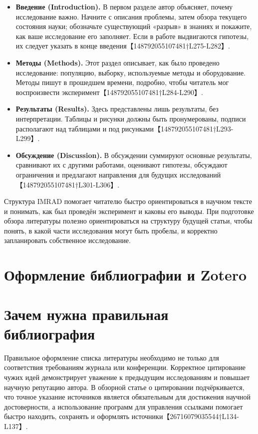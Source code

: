 \documentclass[
  russian,
  12pt,
  a4paper,
]{article}
\providecommand{\tightlist}{%
  \setlength{\itemsep}{0pt}\setlength{\parskip}{0pt}}
\begin{document}
\begin{itemize}
\tightlist
\item
  \textbf{Введение (Introduction).} В первом разделе автор объясняет,
  почему исследование важно. Начните с описания проблемы, затем обзора
  текущего состояния науки; обозначьте существующий «разрыв» в знаниях и
  покажите, как ваше исследование его заполняет. Если в работе
  выдвигаются гипотезы, их следует указать в конце
  введения【148792055107481†L275-L282】.
\item
  \textbf{Методы (Methods).} Этот раздел описывает, как было проведено
  исследование: популяцию, выборку, используемые методы и оборудование.
  Методы пишут в прошедшем времени, подробно, чтобы читатель мог
  воспроизвести эксперимент【148792055107481†L284-L290】.
\item
  \textbf{Результаты (Results).} Здесь представлены лишь результаты, без
  интерпретации. Таблицы и рисунки должны быть пронумерованы, подписи
  располагают над таблицами и под
  рисунками【148792055107481†L293-L299】.
\item
  \textbf{Обсуждение (Discussion).} В обсуждении суммируют основные
  результаты, сравнивают их с другими работами, оценивают гипотезы,
  обсуждают ограничения и предлагают направления для будущих
  исследований【148792055107481†L301-L306】.
\end{itemize}

Структура IMRAD помогает читателю быстро ориентироваться в научном
тексте и понимать, как был проведён эксперимент и каковы его выводы. При
подготовке обзора литературы полезно ориентироваться на структуру
будущей статьи, чтобы понять, в какой части исследования могут быть
пробелы, и корректно запланировать собственное исследование.

\chapter{Оформление библиографии и
Zotero}\label{ux43eux444ux43eux440ux43cux43bux435ux43dux438ux435-ux431ux438ux431ux43bux438ux43eux433ux440ux430ux444ux438ux438-ux438-zotero}

\chapter{Зачем нужна правильная библиография}\label{sec-bibliography}

Правильное оформление списка литературы необходимо не только для
соответствия требованиям журнала или конференции. Корректное цитирование
чужих идей демонстрирует уважение к предыдущим исследованиям и повышает
научную репутацию автора. В обзорной статье о цитировании
подчёркивается, что точное указание источников является обязательным для
достижения научной достоверности, а использование программ для
управления ссылками помогает быстро находить, сохранять и оформлять
источники【26716079035544†L134-L137】.
\end{document}
